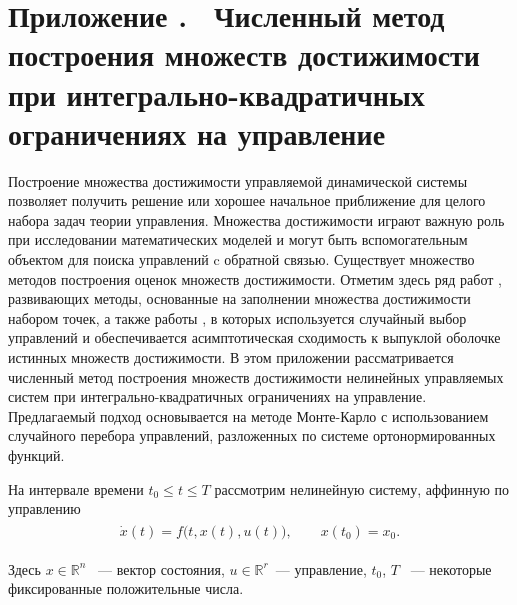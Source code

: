 \documentclass[../main.tex]{subfiles}
\begin{document}
\clearpage
\setcounter{section}{0}%
\renewcommand{\thesection}{\Alph{section}}%
\section*{Приложение .  Численный метод построения множеств достижимости при интегрально-квадратичных ограничениях на управление}%
\label{app:A}%
\renewcommand{\theequation}{\Alph{section}.\arabic{equation}}%
\setcounter{equation}{0}
  Построение множества достижимости управляемой динамической системы позволяет получить решение или хорошее начальное
  приближение для целого набора задач теории управления. 
  Множества достижимости играют важную роль при исследовании математических моделей и могут быть вспомогательным объектом для поиска управлений c обратной связью. 
  Существует множество методов построения оценок множеств достижимости. 
  Отметим здесь ряд работ \cite{Gornov2015, Gornov2017}, развивающих методы, основанные на заполнении множества достижимости набором точек, а также работы \cite{Lew2020, Lew2022}, в которых используется случайный выбор управлений и обеспечивается асимптотическая сходимость к выпуклой оболочке истинных множеств достижимости.
  В этом приложении рассматривается численный метод построения множеств достижимости нелинейных управляемых систем при интегрально-квадратичных ограничениях на управление. 
  Предлагаемый подход основывается на методе Монте-Карло с использованием случайного перебора управлений, разложенных по системе ортонормированных функций.
  
  На интервале времени $ t_0 \leqslant t \leqslant {T} $ рассмотрим нелинейную систему, аффинную по управлению
  \begin{gather}\label{a1:common_nonlinear}
  	\begin{gathered}
  		\dot{x}(t)=f\big(t, x(t), u(t)\big), \qquad x(t_0) = x_0.
  	\end{gathered}
  \end{gather}
  
  Здесь $ x \in \mathbb{R}^n $ ~--- вектор состояния, $ u \in \mathbb{R}^r $~--- управление,  $t_0$, $ {T} $ ~--- некоторые фиксированные положительные числа.
  
\end{document}
